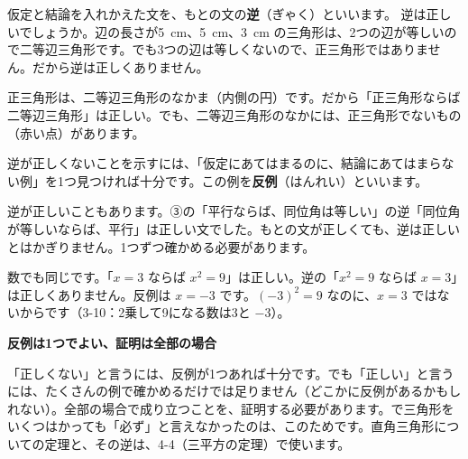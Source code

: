 仮定と結論を入れかえた文を、もとの文の\textbf{逆}（ぎゃく）といいます。
逆は正しいでしょうか。辺の長さが\qty{5}{cm}、\qty{5}{cm}、\qty{3}{cm} の三角形は、2つの辺が等しいので二等辺三角形です。でも3つの辺は等しくないので、正三角形ではありません。だから逆は正しくありません。

\par\addvspace{4pt}\noindent\begin{minipage}[c]{0.44\linewidth}\centering
{}
\end{minipage}\hfill
\begin{minipage}[c]{0.53\linewidth}
正三角形は、二等辺三角形のなかま（内側の円）です。だから「正三角形ならば二等辺三角形」は正しい。でも、二等辺三角形のなかには、正三角形でないもの（赤い点）があります。

逆が正しくないことを示すには、「仮定にあてはまるのに、結論にあてはまらない例」を1つ見つければ十分です。この例を\textbf{反例}（はんれい）といいます。
\end{minipage}

\par\vspace{4pt}
逆が正しいこともあります。③の「平行ならば、同位角は等しい」の逆「同位角が等しいならば、平行」は正しい文でした。もとの文が正しくても、逆は正しいとはかぎりません。1つずつ確かめる必要があります。

数でも同じです。「$x=3$ ならば $x^2=9$」は正しい。逆の「$x^2=9$ ならば $x=3$」は正しくありません。反例は $x=-3$ です。$(-3)^2=9$ なのに、$x=3$ ではないからです（3-10：2乗して9になる数は3と $-3$）。

\begin{seikaku}
\textbf{反例は1つでよい、証明は全部の場合}\par
「正しくない」と言うには、反例が1つあれば十分です。でも「正しい」と言うには、たくさんの例で確かめるだけでは足りません（どこかに反例があるかもしれない）。全部の場合で成り立つことを、証明する必要があります。\bkhatenaref で三角形をいくつはかっても「必ず」と言えなかったのは、このためです。直角三角形についての定理と、その逆は、4-4（三平方の定理）で使います。
\end{seikaku}


